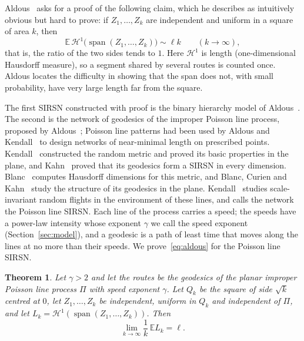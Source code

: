 \documentclass[11pt]{amsart}
\newtheorem{theorem}{Theorem}[section]
\theoremstyle{remark}
\newcommand{\E}{\mathbb{E}}
\newcommand{\Hone}{\mathcal{H}^1}
\newcommand{\spn}{\operatorname{span}}
\begin{document}
Aldous~\cite[Section~8.4.3, Open Problem~35]{Aldous} asks for a proof of the following claim, which he describes
as intuitively obvious but hard to prove: if $Z_1,\dots,Z_k$ are independent and uniform in a square of area $k$, then
\begin{equation}\label{eq:aldous}
\E\,\Hone\bigl(\spn(Z_1,\dots,Z_k)\bigr)\sim\ell k\qquad(k\to\infty),
\end{equation}
that is, the ratio of the two sides tends to $1$. Here $\Hone$ is length (one-dimensional Hausdorff measure), so a
segment shared by several routes is counted once. Aldous locates the difficulty in showing that the span does not,
with small probability, have very large length far from the square.

The first SIRSN constructed with proof is the binary hierarchy model of
Aldous~\cite[Section~3]{Aldous}. The second is the network of geodesics of
the improper Poisson line process, proposed by Aldous~\cite[Section~4.1]{Aldous}; Poisson line patterns had been used
by Aldous and Kendall~\cite{AK} to design networks of near-minimal length on prescribed points. Kendall~\cite{Kendall} constructed the random metric and proved
its basic properties in the plane, and Kahn~\cite{Kahn} proved that its geodesics form a SIRSN in every dimension.
Blanc~\cite{Blanc} computes Hausdorff dimensions for this metric, and Blanc, Curien and Kahn~\cite{BCK} study the
structure of its geodesics in the plane. Kendall~\cite{KendallRRF} studies scale-invariant random flights in the
environment of these lines, and calls the network the Poisson line SIRSN. Each line of the process carries a speed; the speeds have a power-law
intensity whose exponent $\gamma$ we call the speed exponent (Section~\ref{sec:model}), and a geodesic is a path of
least time that moves along the lines at no more than their speeds. We prove~\eqref{eq:aldous} for the Poisson line
SIRSN.

\begin{theorem}\label{thm:main}
Let $\gamma>2$ and let the routes be the geodesics of the planar improper Poisson line process $\Pi$ with speed exponent
$\gamma$. Let $Q_k$ be the square of side $\sqrt k$ centred at $0$, let $Z_1,\dots,Z_k$ be independent, uniform in
$Q_k$ and independent of $\Pi$, and let $L_k=\Hone(\spn(Z_1,\dots,Z_k))$. Then
\[
\lim_{k\to\infty}\frac1k\,\E L_k=\ell .
\]
\end{theorem}
\end{document}
